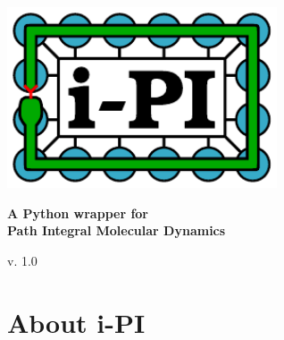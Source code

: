 \documentclass[11pt,english,fleqn]{report}
\begin{document}
\newcommand{\dd}{\; \mathrm{d}} 
\newcommand{\Tr}{\mathrm{Tr}} 
\newcommand{\bra}{< \! \!} 
\newcommand{\ket}{\! \! >} 
\newcommand{\betan}{\beta_N} 
\newcommand{\logn}{\mathrm{ln}} 
\newcommand{\expon}{\mathrm{exp}} 
\newcommand{\Imag}{\mathrm{Im}}
\newcommand{\ipi}{{i-PI}\xspace}
\newcommand{\DFT}{Quantum Espresso, CP2K, CPMD and FHI-AIMS }
\newcommand{\empirical}{LAMMPS}

\begin{titlepage} 

\begin{center}
\vspace*{2.5cm}

\par\end{center}

\begin{center}
\includegraphics[width=0.6\textwidth]{ipi-logo.pdf}
\par\end{center}

\begin{center}
{\Large\bf A Python wrapper for \\Path Integral Molecular Dynamics}
\par\end{center}

\begin{center}
{\large v. 1.0}
\par\end{center}

\end{titlepage}


\tableofcontents{}


\newpage{}


\chapter{About \ipi}
\end{document}
